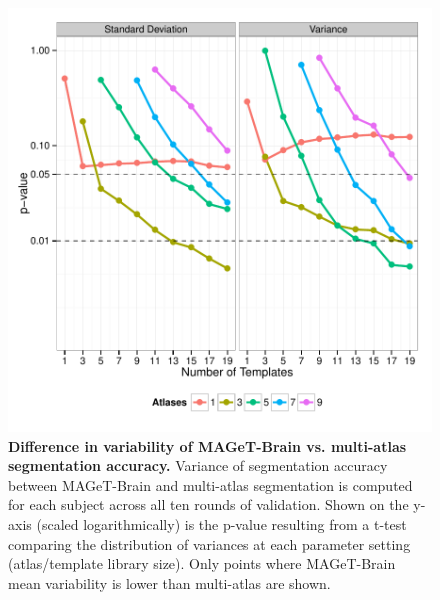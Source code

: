 \documentclass{article}\usepackage{graphicx, color}
\makeatletter
\def\maxwidth{ %
  \ifdim\Gin@nat@width>\linewidth
    \linewidth
  \else
    \Gin@nat@width
  \fi
}
\newenvironment{knitrout}{}{} %
\newcommand{\mb}{MAGeT-Brain }
\makeatother
\begin{document}
\begin{figure}
\begin{knitrout}
\color{fgcolor}

{\centering \includegraphics[width=\maxwidth]{figure/ADN1-Xval-variability} 

}



\end{knitrout}

  \caption{{\bf Difference in variability of \mb vs. multi-atlas segmentation 
  accuracy.}
  Variance of segmentation accuracy between \mb and multi-atlas segmentation 
  is computed for each subject across all ten rounds of validation. Shown on the 
  y-axis (scaled logarithmically) is the  p-value resulting from a t-test 
  comparing the distribution of variances at each parameter setting 
  (atlas/template library size). Only points where \mb mean variability is lower 
  than multi-atlas are shown.}
  \label{ADNI1-xval-variability}
\end{figure}

\FloatBarrier

\end{document}
